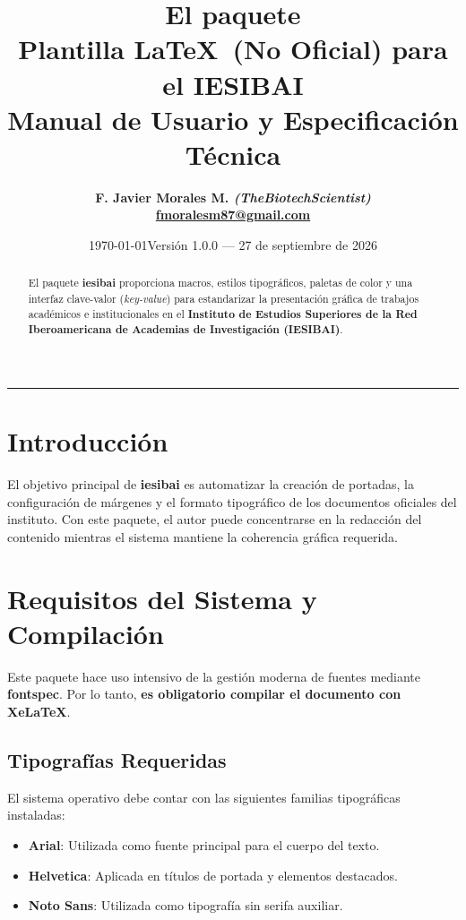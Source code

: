 \documentclass[11pt,a4paper]{article}
\title{%
    \Huge \textbf{\color{iesblueprimary}El paquete \pkg{iesibai}}\\[0.3em]
    \large Plantilla \LaTeX \ (No Oficial) para el \textbf{IESIBAI}\\[0.2em]
    \small Manual de Usuario y Especificación Técnica
}
\author{\textbf{F. Javier Morales M. \textit{(TheBiotechScientist)}}\\[10pt] {\bfseries \ttfamily \href{mailto:fmoralesm87@gmail.com}{fmoralesm87@gmail.com}}}
\date{\today}
\date{Versión 1.0.0 --- 27 de septiembre de 2026}
\newcommand{\pkg}[1]{\textbf{#1}}
\begin{document}
\maketitle

\begin{abstract}
El paquete \pkg{iesibai} proporciona macros, estilos tipográficos, paletas de color y una interfaz clave-valor (\emph{key-value}) para estandarizar la presentación gráfica de trabajos académicos e institucionales en el \textbf{Instituto de Estudios Superiores de la Red Iberoamericana de Academias de Investigación (IESIBAI)}.
\end{abstract}

\tableofcontents
\vspace{0.8cm}
\hrule
\vspace{0.8cm}

\section{Introducción}
El objetivo principal de \pkg{iesibai} es automatizar la creación de portadas, la configuración de márgenes y el formato tipográfico de los documentos oficiales del instituto. Con este paquete, el autor puede concentrarse en la redacción del contenido mientras el sistema mantiene la coherencia gráfica requerida.

\section{Requisitos del Sistema y Compilación}
Este paquete hace uso intensivo de la gestión moderna de fuentes mediante \pkg{fontspec}. Por lo tanto, \textbf{es obligatorio compilar el documento con XeLaTeX}.

\subsection{Tipografías Requeridas}
El sistema operativo debe contar con las siguientes familias tipográficas instaladas:
\begin{itemize}
    \item \textbf{Arial}: Utilizada como fuente principal para el cuerpo del texto.
    \item \textbf{Helvetica}: Aplicada en títulos de portada y elementos destacados.
    \item \textbf{Noto Sans}: Utilizada como tipografía sin serifa auxiliar.
\end{itemize}
\end{document}
